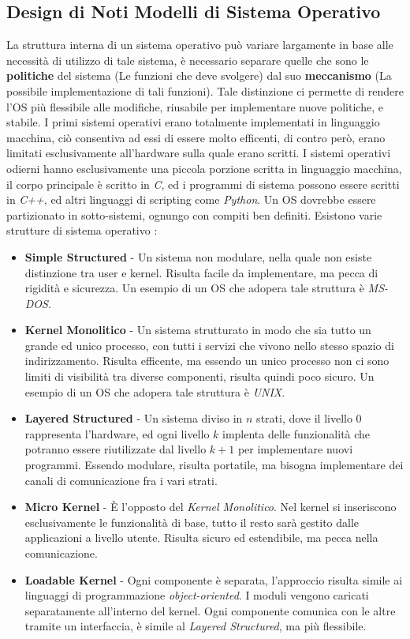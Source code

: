 \documentclass[12pt, letterpaper]{article}
\begin{document}
\subsection{Design di Noti Modelli di Sistema Operativo}
La struttura interna di un sistema operativo può variare largamente in base alle necessità di utilizzo 
di tale sistema, è necessario separare quelle che sono le \textbf{politiche} del sistema 
(Le funzioni che deve svolgere) dal suo \textbf{meccanismo} (La possibile implementazione di tali funzioni).
Tale distinzione ci permette di rendere l'OS più flessibile alle modifiche, riusabile per implementare nuove 
politiche, e stabile. I primi sistemi operativi erano totalmente implementati in linguaggio macchina, ciò 
consentiva ad essi di essere molto efficenti, di contro però, erano limitati esclusivamente all'hardware sulla 
quale erano scritti. I sistemi operativi odierni hanno esclusivamente una piccola porzione scritta in 
linguaggio macchina, il corpo principale è scritto in \textit{C}, ed i programmi di sistema possono essere scritti 
in \textit{C++}, ed altri linguaggi di scripting come \textit{Python}. Un OS dovrebbe essere partizionato 
in sotto-sistemi, ognungo con compiti ben definiti. Esistono varie strutture di sistema operativo :
\begin{itemize}
    \item \textbf{Simple Structured} - Un sistema non modulare, nella quale non esiste distinzione tra 
    user e kernel. Risulta facile da implementare, ma pecca di rigidità e sicurezza. Un esempio di un OS che 
    adopera tale struttura è \textit{MS-DOS}.
    \item \textbf{Kernel Monolitico} - Un sistema strutturato in modo che sia tutto un grande ed unico processo, con
    tutti i servizi che vivono nello stesso spazio di indirizzamento. Risulta efficente,
    ma essendo un unico processo non ci sono limiti di visibilità tra diverse componenti, risulta 
    quindi poco sicuro. Un esempio di un OS che adopera tale struttura è \textit{UNIX}.
    \item \textbf{Layered Structured} - Un sistema diviso in \(n\) strati, dove il livello 0 rappresenta l'hardware, 
    ed ogni livello \(k\) implenta delle funzionalità che potranno essere riutilizzate dal livello \(k+1\) per 
    implementare nuovi programmi. Essendo modulare, risulta portatile, ma bisogna implementare dei canali di 
    comunicazione fra i vari strati.
    \item \textbf{Micro Kernel} - È l'opposto del \textit{Kernel Monolitico}. Nel kernel si inseriscono 
    esclusivamente le funzionalità di base, tutto il resto sarà gestito dalle applicazioni a livello utente. Risulta
    sicuro ed estendibile, ma pecca nella comunicazione. 
    \item \textbf{Loadable Kernel} - Ogni componente è separata, l'approccio risulta simile ai linguaggi 
    di programmazione \textit{object-oriented}. I moduli vengono caricati separatamente all'interno del 
    kernel. Ogni componente comunica con le altre tramite un interfaccia, è simile al \textit{Layered Structured},
    ma più flessibile.
\end{itemize}
\end{document}

